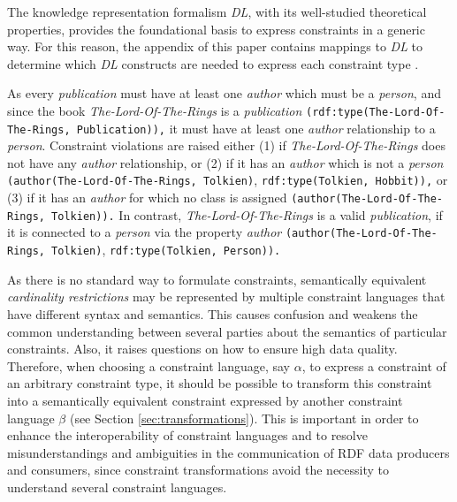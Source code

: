 \documentclass[a4paper,fontsize=11pt]{scrartcl}
\newcommand{\ms}[1]{\texttt{#1}}
\begin{document}
The knowledge representation formalism {\em DL}, with its  well-studied theoretical properties, provides the foundational basis to express constraints in a generic way. 
For this reason, the appendix of this paper contains mappings to \emph{DL} to determine which \emph{DL} constructs are needed to express each constraint type \cite{BoschNolleAcarEckert2015}.

As every \emph{publication} must have at least one \emph{author} which must be a \emph{person}, 
and since the book \emph{The-Lord-Of-The-Rings} is a \emph{publication} {\small\ms{(rdf:type(The-Lord-Of-The-Rings, Publication)),}} 
it must have at least one \emph{author} relationship to a \emph{person}.
Constraint violations are raised either (1) if
\emph{The-Lord-Of-The-Rings} does not have any \emph{author} relationship, or (2) if 
it has an \emph{author} which is not a \emph{person} \\
{\small\ms{(author(The-Lord-Of-The-Rings, Tolkien)}, \ms{rdf:type(Tolkien, Hobbit)),}} 
or (3) if it has an \emph{author} for which no class is assigned
{\small\ms{(author(The-Lord-Of-The-Rings, Tolkien)).}}
In contrast, \emph{The-Lord-Of-The-Rings} is a valid \emph{publication}, if it is connected to a \emph{person} via the property \emph{author}
{\small\ms{(author(The-Lord-Of-The-Rings, Tolkien)}, \ms{rdf:type(Tolkien, Person)).}}

As there is no standard way to formulate constraints, 
semantically equivalent \emph{cardinality restrictions} may be represented by multiple constraint languages that have different syntax and semantics.
This causes confusion and weakens the common understanding between several parties about the semantics of particular constraints. Also, it raises  questions on how to ensure high data quality. 
Therefore, when choosing a constraint language, say \ms{$\alpha$}, to express a constraint of an arbitrary constraint type, it should be possible to transform this constraint into a semantically equivalent constraint expressed by another constraint language \ms{$\beta$} (see Section \ref{sec:transformations}). 
This is important in order to enhance the interoperability of constraint languages and to resolve misunderstandings and ambiguities in the communication of RDF data producers and consumers, 
since constraint transformations avoid the necessity to understand several constraint languages.
\end{document}
